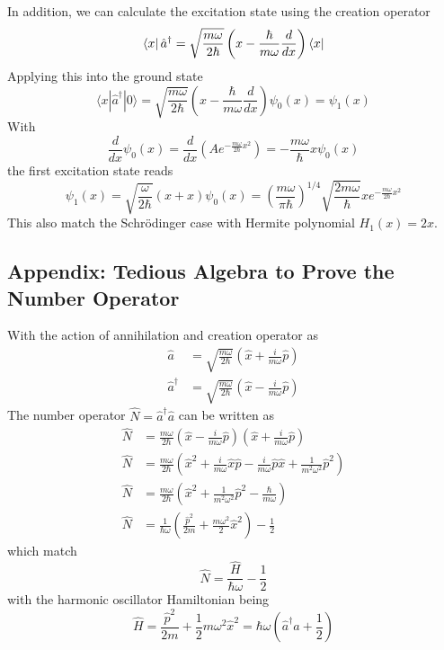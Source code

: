 \documentclass[../../../main.tex]{subfiles}
\begin{document}
In addition, we can calculate the excitation state using the creation operator
\begin{equation*}
  \bra{x}\hat{a}^\dagger = \sqrt{\frac{m \omega}{2 \hbar}} \left( x - \frac{\hbar }{m \omega} \frac{d }{dx} \right) \bra{x}
\end{equation*}
Applying this into  the ground state
\begin{equation*}
  \langle x | \hat{a}^\dagger | 0 \rangle =
  \sqrt{\frac{m \omega}{2 \hbar}} \left( x - \frac{\hbar}{m \omega} \frac{d}{dx} \right) \psi_0(x)
  =\psi_1 (x)
\end{equation*}
With
\begin{equation*}
  \frac{d}{dx} \psi_0(x) = \frac{d}{dx} \left( A e^{-\frac{m \omega}{2 \hbar} x^2} \right) = -\frac{m \omega}{\hbar} x \psi_0(x)
\end{equation*}
the first excitation state reads
\begin{equation*}
    \psi_1 (x)
  = \sqrt{\frac{ \omega}{2 \hbar}} \left( x +x \right) \psi_0(x)
  =\left( \frac{m \omega}{\pi \hbar} \right)^{1/4} \sqrt{\frac{2m \omega}{\hbar}} x e^{-\frac{m \omega}{2 \hbar} x^2}
\end{equation*}
This also match the Schrödinger case with Hermite polynomial $H_1(x)=2x$.

\subsection{Appendix: Tedious Algebra to Prove the Number Operator}
With the action of annihilation and creation operator as 
\begin{align*}
  \hat{a} &=  \sqrt{\frac{m \omega}{2 \hbar}} \left( \hat{x} +  \frac{i }{m\omega}\hat{p} \right) \\
  \hat{a}^\dagger &=  \sqrt{\frac{m \omega}{2 \hbar}} \left( \hat{x} - \frac{i }{m\omega}\hat{p} \right) 
\end{align*}
The number operator $\hat{N}=\hat{a}^\dagger \hat{a}$ can be written as 
\begin{align*}
\hat{N} &=  \frac{m\omega}{2\hbar} \left( \hat{x} - \frac{i}{m\omega} \hat{p} \right) \left( \hat{x} + \frac{i}{m\omega} \hat{p} \right)\\
\hat{N} &=  \frac{m\omega}{2\hbar} \left( \hat{x}^2 + \frac{i}{m\omega} \hat{x} \hat{p} - \frac{i}{m\omega} \hat{p} \hat{x} + \frac{1}{m^2\omega^2} \hat{p}^2 \right)\\
\hat{N} &=  \frac{m \omega}{2 \hbar} \left( \hat{x}^2 + \frac{1}{m^2 \omega^2} \hat{p}^2 - \frac{\hbar}{m \omega} \right)\\
\hat{N} &=  \frac{1}{ \hbar \omega} \left( \frac{\hat{p}^2}{2m} +\frac{ m \omega^2 }{2} \hat{x}^2 \right) - \frac{1}{2}
\end{align*}
which match 
\begin{equation*}
  \hat{N} = \frac{\hat{H}}{\hbar \omega} - \frac{1}{2}
\end{equation*}
with the harmonic oscillator Hamiltonian being 
\begin{equation*}
  \hat{H} = \frac{\hat{p}^2}{2m} + \frac{1}{2} m \omega^2 \hat{x}^2 = \hbar \omega \left( \hat{a}^\dagger \hat{a} + \frac{1 }{2} \right) 
\end{equation*}
\end{document}
